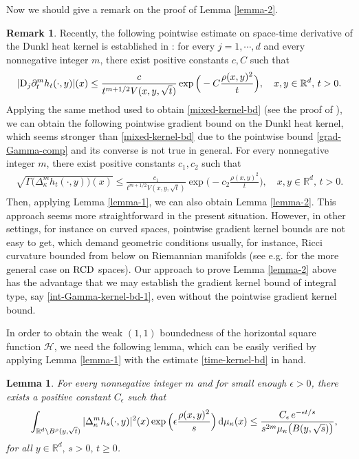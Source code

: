\documentclass[11pt,a4paper]{article}
\def\R{\mathbb{R}}
\def\D{\mathbb{D}}
\def\d{\textup{d}}
\def\D{\textup{D}}
\def\RCD{\textup{RCD}}
\newtheorem{lemma}[theorem]{Lemma}
\theoremstyle{definition}\newtheorem{remark}[theorem]{Remark}
\begin{document}
Now we should give a remark on the proof of Lemma \ref{lemma-2}.
\begin{remark} Recently, the following pointwise estimate on space-time derivative of the Dunkl heat kernel is established in \cite[Theorem 4.1(c)]{ADH2019}: for every $j=1,\cdots,d$ and every nonnegative integer $m$, there exist positive constants $c,C$ such that
\begin{eqnarray}\label{mixed-kernel-bd}
|\D_j \partial_t^m h_t(\cdot,y)|(x)\leq \frac{c}{t^{m+1/2}V(x,y,\sqrt{t})}\exp\Big(-C\frac{\rho(x,y)^2}{t}\Big),\quad x,y\in\R^d,\,t>0.
\end{eqnarray}
Applying the same method used to obtain \eqref{mixed-kernel-bd} (see the proof of \cite[Theorem 4.1(c)]{ADH2019}), we can obtain the following pointwise gradient bound on the Dunkl heat kernel, which seems stronger than \eqref{mixed-kernel-bd} due to the pointwise bound \eqref{grad-Gamma-comp} and its converse is not true in general. For every nonnegative integer $m$,  there exist positive constants $c_1, c_2$ such that
\begin{eqnarray*}\label{Gamma-kernel-bd}
\sqrt{\Gamma\big(\Delta_\kappa^m h_t(\cdot,y)\big)(x)}\leq \frac{c_1}{t^{m+1/2}V(x,y,\sqrt{t})}\exp\Big(-c_2\frac{\rho(x,y)^2}{t}\Big),\quad x,y\in\R^d,\,t>0.
\end{eqnarray*}
Then, applying Lemma \ref{lemma-1}, we can also obtain Lemma \ref{lemma-2}. This approach seems more straightforward in the present situation.  However, in other settings, for instance on curved spaces, pointwise gradient kernel bounds are not easy to get, which demand geometric conditions usually, for instance, Ricci curvature bounded from below on Riemannian manifolds (see e.g. \cite{JLZ2016} for the more general case on $\RCD$ spaces). Our approach to prove Lemma \ref{lemma-2} above has the advantage that we may establish the gradient kernel bound of integral type, say \eqref{int-Gamma-kernel-bd-1}, even without the pointwise gradient kernel bound.
\end{remark}

In order to obtain the weak $(1,1)$ boundedness of the horizontal square function $\mathcal{H}$, we need the following lemma, which can be easily verified by applying Lemma \ref{lemma-1} with the estimate \eqref{time-kernel-bd} in hand.
\begin{lemma}\label{integral-time-der-bd}
For every nonnegative integer $m$ and for small enough $\epsilon>0$, there exists a positive constant $C_\epsilon$ such that
\begin{eqnarray*}\label{integral-time-der-bd-1}
&&\int_{\R^d\setminus B^\rho(y,\sqrt{t})}|\Delta_{\kappa}^m h_s(\cdot,y)|^2(x)\exp\Big(\epsilon\frac{\rho(x,y)^2}{s}\Big)\,\d\mu_\kappa(x)
\leq\frac{C_\epsilon\,e^{-\epsilon t/s}}{s^{2m}\mu_\kappa\big(B(y,\sqrt{s})\big)},
\end{eqnarray*}
for all $y\in\R^d,\,s>0,\,t\geq0$.
\end{lemma}
\end{document}

